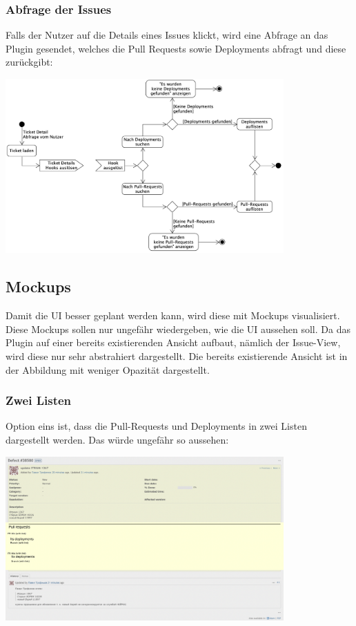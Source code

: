 \subsubsection{Abfrage der Issues}
Falls der Nutzer auf die Details eines Issues klickt, wird eine Abfrage an das Plugin gesendet, welches die Pull Requests sowie
Deployments abfragt und diese zurückgibt: \newline
\begin{center}
  \includegraphics[width=0.8\textwidth]{images/activity/issues-view.png}
  \label{fig:activity_issues}
\end{center}

\subsection{Mockups}
\label{sec:mockups}
Damit die UI besser geplant werden kann, wird diese mit Mockups visualisiert. Diese Mockups sollen
nur ungefähr wiedergeben, wie die UI aussehen soll. Da das Plugin auf einer bereits existierenden 
Ansicht aufbaut, nämlich der Issue-View, wird diese nur sehr abstrahiert dargestellt. \newline
Die bereits existierende Ansicht ist in der Abbildung mit weniger Opazität dargestellt. \newline

  \subsubsection{Zwei Listen}
  Option eins ist, dass die Pull-Requests und Deployments in zwei Listen dargestellt werden. Das würde ungefähr so
  aussehen: \newline
  \begin{center}
    \includegraphics[width=0.8\textwidth]{images/mockup/multiple-lists.png}
    \label{fig:mockup_multi_lists}
    \newline
  \end{center}

